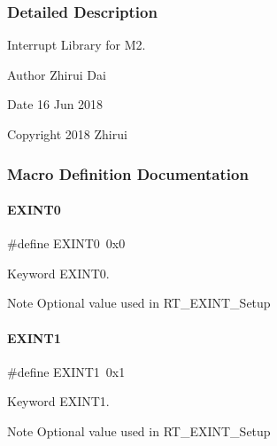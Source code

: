 \subsubsection{Detailed Description}
Interrupt Library for M2. 

\begin{DoxyAuthor}{Author}
Zhirui Dai 
\end{DoxyAuthor}
\begin{DoxyDate}{Date}
16 Jun 2018 
\end{DoxyDate}
\begin{DoxyCopyright}{Copyright}
2018 Zhirui 
\end{DoxyCopyright}


\subsubsection{Macro Definition Documentation}
\mbox{\label{a00011_a2e3f727d359d26314631842394f4a223}} 
\paragraph{\texorpdfstring{E\+X\+I\+N\+T0}{EXINT0}}
{\footnotesize\ttfamily \#define E\+X\+I\+N\+T0~0x0}



Keyword E\+X\+I\+N\+T0. 

\begin{DoxyNote}{Note}
Optional value used in R\+T\+\_\+\+E\+X\+I\+N\+T\+\_\+\+Setup 
\end{DoxyNote}
\mbox{\label{a00011_a1ea7d6796165b98f1bc6bf6fe841c3d9}} 
\paragraph{\texorpdfstring{E\+X\+I\+N\+T1}{EXINT1}}
{\footnotesize\ttfamily \#define E\+X\+I\+N\+T1~0x1}



Keyword E\+X\+I\+N\+T1. 

\begin{DoxyNote}{Note}
Optional value used in R\+T\+\_\+\+E\+X\+I\+N\+T\+\_\+\+Setup 
\end{DoxyNote}
\mbox{\label{a00011_ac959f4d8aed4e04e25c966e6c8315431}} 
